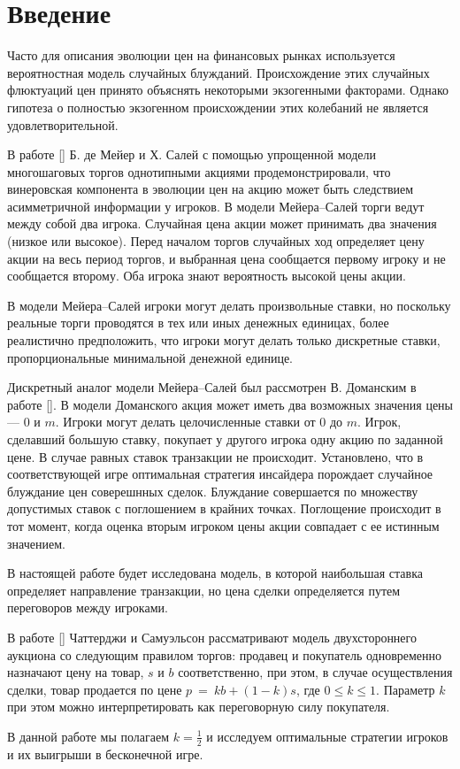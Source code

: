 \section{Введение}
Часто для описания эволюции цен на финансовых рынках используется вероятностная модель случайных блужданий. Происхождение этих случайных флюктуаций цен принято объяснять некоторыми экзогенными факторами. Однако гипотеза о полностью экзогенном происхождении этих колебаний не является удовлетворительной.

В работе [\demeyer] Б. де Мейер и Х. Салей с помощью упрощенной модели многошаговых торгов однотипными акциями продемонстрировали, что винеровская компонента в эволюции цен на акцию может быть следствием асимметричной информации у игроков. В модели Мейера--Салей торги ведут между собой два игрока.
Случайная цена акции может принимать два значения (низкое или высокое).
Перед началом торгов случайных ход определяет цену акции на весь период торгов, и выбранная цена сообщается первому игроку и не сообщается второму. 
Оба игрока знают вероятность высокой цены акции.

В модели Мейера--Салей игроки могут делать произвольные ставки, но поскольку реальные торги проводятся в тех или иных денежных единицах, более реалистично предположить, что игроки могут делать только дискретные ставки, пропорциональные минимальной денежной единице.
 
Дискретный аналог модели Мейера--Салей был рассмотрен В. Доманским в работе [\domansky]. В модели Доманского акция может иметь два возможных значения цены --- $ 0 $ и $ m $. Игроки могут делать целочисленные ставки от $ 0 $ до $ m $. Игрок, сделавший большую ставку, покупает у другого игрока одну акцию по заданной цене. В случае равных ставок транзакции не происходит. Установлено, что в соответствующей игре оптимальная стратегия инсайдера порождает случайное блуждание цен соверешнных сделок. Блуждание совершается по множеству допустимых ставок с поглошением в крайних точках. Поглощение происходит в тот момент, когда оценка вторым игроком цены акции совпадает с ее истинным значением.

В настоящей работе будет исследована модель, в которой наибольшая ставка определяет направление транзакции, но цена сделки определяется путем переговоров между игроками. 

В работе [\samuelson] Чаттерджи и Самуэльсон рассматривают модель двухстороннего аукциона со следующим правилом торгов: продавец и покупатель одновременно назначают цену на товар, $ s $ и $ b $ соответственно, при этом, в случае осуществления сделки, товар продается по цене $ p~=~kb + (1-k)s $, где $ 0 \leq k \leq 1  $. Параметр $ k $ при этом можно интерпретировать как переговорную силу покупателя. 

В данной работе мы полагаем $ k = \frac{1}{2} $ и исследуем оптимальные стратегии игроков и их выигрыши в бесконечной игре.